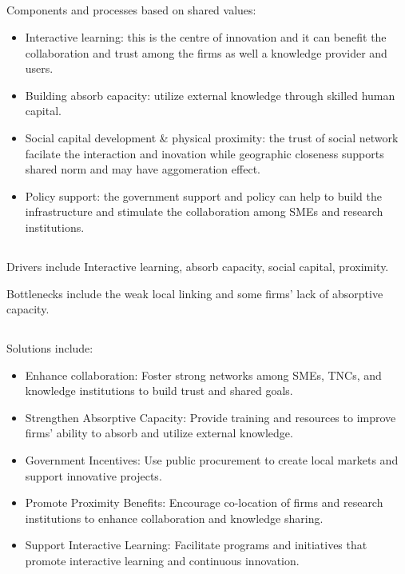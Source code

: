 \documentclass[UTF8,a4paper,AutoFakeBold,AutoFakeSlant]{article}
\begin{document}
\subsection{}

Components and processes based on shared values:
\begin{itemize}
    \item Interactive learning: this is the centre of innovation and it can benefit the collaboration and trust among the firms as well a knowledge provider and users.
    \item Building absorb capacity:  utilize external knowledge through skilled human capital.
    \item Social capital development \& physical proximity: the trust of social network facilate the interaction and inovation while geographic closeness supports shared norm and may have aggomeration effect.
    \item Policy support: the government support and policy can help to build the infrastructure and stimulate the collaboration among SMEs and research institutions.
\end{itemize}


\subsection{}

Drivers include Interactive learning, absorb capacity, social capital, proximity.

Bottlenecks include the weak local linking and some firms' lack of absorptive capacity.


\subsection{}

Solutions include:
\begin{itemize}
    \item Enhance collaboration: Foster strong networks among SMEs, TNCs, and knowledge institutions to build trust and shared goals.
    \item Strengthen Absorptive Capacity: Provide training and resources to improve firms' ability to absorb and utilize external knowledge.
    \item Government Incentives: Use public procurement to create local markets and support innovative projects.
    \item Promote Proximity Benefits: Encourage co-location of firms and research institutions to enhance collaboration and knowledge sharing.
    \item Support Interactive Learning: Facilitate programs and initiatives that promote interactive learning and continuous innovation.
\end{itemize}
\end{document}
